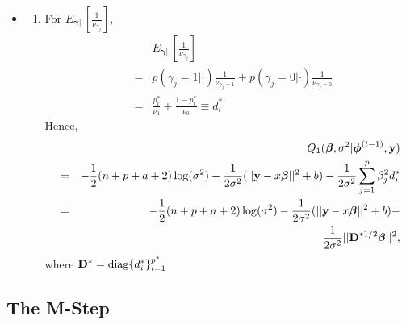 \documentclass[]{book}
\providecommand{\tightlist}{%
  \setlength{\itemsep}{0pt}\setlength{\parskip}{0pt}}
\begin{document}
\begin{itemize}
\item
  \begin{enumerate}
  \def\labelenumi{(\arabic{enumi})}
  \setcounter{enumi}{1}
  \tightlist
  \item
    For \(E_{{\boldsymbol \gamma}|\cdot}[\frac{1}{\nu_{\gamma_j}}]\),
    \begin{eqnarray*}   
          &&E_{{\boldsymbol \gamma}|\cdot}[\frac{1}{\nu_{\gamma_j}}]\\
          &=&p(\gamma_j=1|\cdot)\frac{1}{\nu_{\gamma_j=1}} +
          p(\gamma_j=0|\cdot)\frac{1}{\nu_{\gamma_j=0}}\\
          &=& \frac{p_i^*}{\nu_{1}}+\frac{1-p_i^*}{\nu_{0}} \equiv d^*_i 
    \end{eqnarray*}
    Hence,
    \begin{eqnarray}
      &&Q_1({\boldsymbol \beta},\sigma^2|{\boldsymbol \phi}^{(t-1)},{\bf y})\nonumber\\
      &=& -\frac{1}{2}(n+p+a+2)\log(\sigma^2)-\frac{1}{2\sigma^2}(||{\bf y}-x{\boldsymbol \beta}||^2+b)-\frac{1}{2\sigma^2}
      \sum_{j=1}^{p}\beta_j^2d^*_i \nonumber\\
      &=& -\frac{1}{2}(n+p+a+2)\log(\sigma^2)-\frac{1}{2\sigma^2}(||{\bf y}-x{\boldsymbol \beta}||^2+b)-\nonumber\\
      &&\frac{1}{2\sigma^2} ||{\bf D}^{*1/2}{\boldsymbol \beta}||^2, 
      \label{eq:q1}
    \end{eqnarray}
    where \({\bf D}^*={\rm diag}\{d_i^*\}_{i=1}^{p^*}\)
  \end{enumerate}
\end{itemize}

\hypertarget{the-m-step}{%
\subsection{The M-Step}\label{the-m-step}}
\end{document}

